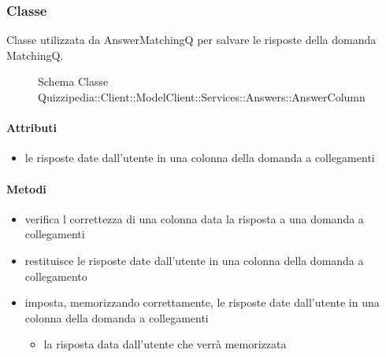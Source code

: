 \subsubsection{Classe }
Classe utilizzata da AnswerMatchingQ per salvare le risposte della domanda MatchingQ.
\begin{figure}[H]
\centering
\noindent{}
\caption[Schema Classe AnswerColumn]{Schema Classe Quizzipedia::Client::ModelClient::Services::Answers::AnswerColumn}
\end{figure}
\paragraph{Attributi}
\begin{itemize}
\item {}
\newline
le risposte date dall'utente in una colonna della domanda a collegamenti
\end{itemize}
\paragraph{Metodi}
\begin{itemize}
\item {}
\newline
verifica l correttezza di una colonna data la risposta a una domanda a collegamenti
\newline
\item {}
\newline
restituisce le risposte date dall'utente in una colonna della domanda a collegamento
\newline
\item {}
\newline
imposta, memorizzando correttamente, le risposte date dall'utente in una colonna della domanda a collegamenti
\newline
{}
\newline
\begin{itemize}
\item {}
\newline
la risposta data dall'utente che verrà memorizzata
\end{itemize}
\end{itemize}
